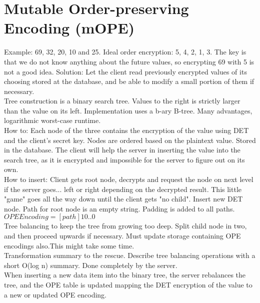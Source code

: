 \documentclass[10pt]{article}
\begin{document}
\section{Mutable Order-preserving Encoding (mOPE)}

Example: 69, 32, 20, 10 and 25. Ideal order encryption: 5, 4, 2, 1, 3. The key is that we do not know anything about the future values, so encrypting 69 with 5 is not a good idea. Solution: Let the client read previously encrypted values of its choosing stored at the database, and be able to modify a small portion of them if necessary.\\

Tree construction is a binary search tree. Values to the right is strictly larger than the value on its left. Implementation uses a b-ary B-tree. Many advantages, logarithmic worst-case runtime.\\

How to: Each node of the three contains the encryption of the value using DET and the client's secret key. Nodes are ordered based on the plaintext value. Stored in the database. The client will help the server in inserting the value into the search tree, as it is encrypted and impossible for the server to figure out on its own.\\

How to insert: Client gets root node, decrypts and request the node on next level if the server goes... left or right depending on the decrypted result. This little "game" goes all the way down until the client gets "no child". Insert new DET node. Path for root node is an empty string. Padding is added to all paths.\\

$OPE Encoding = [path]10..0$\\

Tree balancing to keep the tree from growing too deep. Split child node in two, and then proceed upwards if necessary. Must update storage containing OPE encodings also.This might take some time.\\

Transformation summary to the rescue. Describe tree balancing operations with a short O(log n) summary. Done completely by the server.\\

When inserting a new data item into the binary tree, the server rebalances the tree, and the OPE table is updated mapping the DET encryption of the value to a new or updated OPE encoding.
\end{document}
